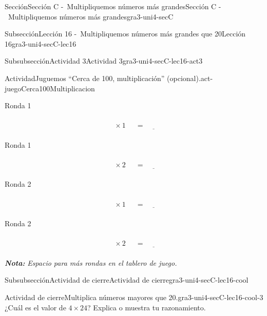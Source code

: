 \documentclass[twoside,14pt,]{extarticle}
\newcommand{\alert}[1]{\textbf{\textit{#1}}}
\begin{document}
\begin{sectionptx}{Sección}{Sección C -~Multipliquemos números más grandes}{}{Sección C -~Multipliquemos números más grandes}{}{}{gra3-uni4-secC}
\begin{subsectionptx}{Subsección}{Lección 16 -~Multipliquemos números más grandes que 20}{}{Lección 16}{}{}{gra3-uni4-secC-lec16}
\begin{subsubsectionptx}{Subsubsección}{Actividad 3}{}{Actividad 3}{}{}{gra3-uni4-secC-lec16-act3}
\begin{activity}{Actividad}{Juguemos “Cerca de 100, multiplicación” (opcional).}{act-juegoCerca100Multiplicacion}
\begin{sidebyside}{2}{0}{0}{0.1}
\begin{sbspanel}{0.45}%
Ronda 1%
\par
%
\begin{equation*}
\boxed{\phantom{\frac{00}{00}}} \times 1 \ \boxed{\phantom{\frac{00}{00}}}= \underline{\hspace{1cm}}
\end{equation*}
%
\end{sbspanel}%
\begin{sbspanel}{0.45}%
Ronda 1%
\par
%
\begin{equation*}
\boxed{\phantom{\frac{00}{00}}} \times 2 \ \boxed{\phantom{\frac{00}{00}}}= \underline{\hspace{1cm}}
\end{equation*}
%
\end{sbspanel}%
\end{sidebyside}%
\begin{sidebyside}{2}{0}{0}{0.1}%
\begin{sbspanel}{0.45}%
Ronda 2%
\par
%
\begin{equation*}
\boxed{\phantom{\frac{00}{00}}} \times 1 \ \boxed{\phantom{\frac{00}{00}}}= \underline{\hspace{1cm}}
\end{equation*}
%
\end{sbspanel}%
\begin{sbspanel}{0.45}%
Ronda 2%
\par
%
\begin{equation*}
\boxed{\phantom{\frac{00}{00}}} \times 2 \ \boxed{\phantom{\frac{00}{00}}}= \underline{\hspace{1cm}}
\end{equation*}
%
\end{sbspanel}%
\end{sidebyside}%
\alert{Nota:} \emph{Espacio para más rondas en el tablero de juego.}%
\end{activity}%
\end{subsubsectionptx}
%
%
\typeout{************************************************}
\typeout{************************************************}
%
\begin{subsubsectionptx}{Subsubsección}{Actividad de cierre}{}{Actividad de cierre}{}{}{gra3-uni4-secC-lec16-cool}
\begin{project}{Actividad de cierre}{Multiplica números mayores que 20.}{gra3-uni4-secC-lec16-cool-3}%
¿Cuál es el valor de \(4\times 24\)? Explica o muestra tu razonamiento.%

\end{project}
\end{subsubsectionptx}
\end{subsectionptx}
\end{sectionptx}
\end{document}
